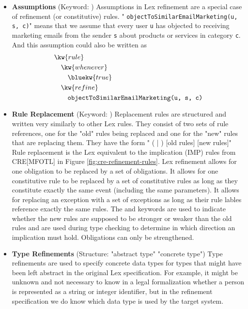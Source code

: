 \begin{itemize}
    \item \textbf{Assumptions}
        (Keyword: )
        Assumptions in Lex refinement are a special case of
        refinement (or constitutive) rules.
        "  \texttt{objectToSimilarEmailMarketing(u, s, c)}"
        means that we assume that every user \texttt{u} has objected
        to receiving marketing emails
        from the sender \texttt{s} about products or services in
        category \texttt{c}.
        And this assumption could also be
        written as
        \begin{align*}
            &\kw{rule} \\
            &\quad \kw{whenever} \\
            &\qquad \bluekw{true} \\
            &\quad \kw{refine} \\ 
            &\qquad \texttt{objectToSimilarEmailMarketing(u, s, c)}
        \end{align*}
    \item \textbf{Rule Replacement}
        (Keyword: )
        Replacement rules are structured and written very similarly to
        other Lex rules.
        They consist of two sets of rule references,
        one for the "old" rules being replaced
        and one for the "new" rules that are replacing them.
        They have the form
        " ( | ) [old rules]  [new rules]"
        Rule replacement is the Lex equivalent to the
        implication (IMP) rules from CRE[MFOTL] in Figure
        \ref{fig:cre-refinement-rules}.
        Lex refinement allows for one obligation to be replaced
        by a set of obligations.
        It allows for one constitutive rule to be replaced by
        a set of constitutive rules as long as they constitute
        exactly the same event (including the same parameters).
        It allows for replacing an exception with a set of exceptions
        as long as their rule lables reference exactly the same rules.
        The  and  keywords
        are used to indicate whether the new rules are supposed to
        be stronger or weaker than the old rules and
        are used during type checking to determine in
        which direction an implication must hold.
        Obligations can only be strengthened.
    \item \textbf{Type Refinements}
        (Structure:   "abstract type"  "concrete type")
        Type refinements are used
        to specify concrete data types for types that
        might have been left abstract in the original
        Lex specification.
        For example, it might be unknown and not necessary
        to know in a legal formalization whether
        a person is represented as a string or integer
        identifier, but in the refinement specification
        we do know which data type is used by the target system.
\end{itemize}


